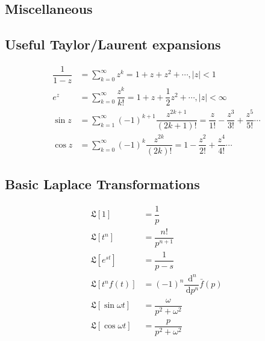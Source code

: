 \documentclass[10pt, a4paper]{article}
\def\d{\,\mathrm{d}}
\def\L{\mathfrak{L}}
\begin{document}
\begin{multicols}{2}
\section{Miscellaneous}
	
	\subsection{Useful Taylor/Laurent expansions}
		\begin{align}
			\dfrac{1}{1-z} &= \sum_{k=0}^{\infty}z^k = 1 + z + z^2 + \cdots, |z|<1\\
			e^z &= \sum_{k=0}^{\infty}\dfrac{z^k}{k!} = 1 + z + \dfrac{1}{2}z^2 + \cdots, |z|<\infty\\
			\sin z &= \sum_{k=1}^{\infty}(-1)^{k+1}\dfrac{z^{2k+1}}{(2k+1)!} = \dfrac{z}{1!} - \dfrac{z^3}{3!} + \dfrac{z^5}{5!} \cdots\\
			\cos z &= \sum_{k=0}^{\infty}(-1)^k\dfrac{z^{2k}}{(2k)!} = 1 - \dfrac{z^2}{2!} + \dfrac{z^4}{4!} \cdots
		\end{align}
	
	\subsection{Basic Laplace Transformations}
		\begin{align}
			\L[1] &= \dfrac{1}{p}\\
			\L[t^n] &= \dfrac{n!}{p^{n+1}}\\
			\L[e^{st}] &= \dfrac{1}{p-s}\\
			\L[t^nf(t)] &= (-1)^n \dfrac{\d^n}{\d p^n} \bar{f}(p)\\
			\L[\sin\omega t] &= \dfrac{\omega}{p^2 + \omega^2}\\
			\L[\cos\omega t] &= \dfrac{p}{p^2 + \omega^2}
		\end{align}
		
\end{multicols}
\end{document}
